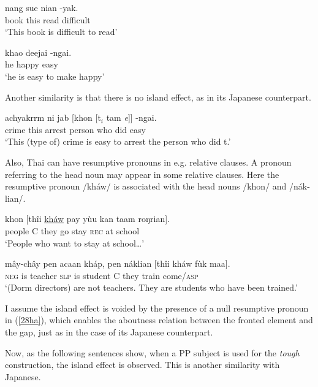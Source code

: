 \documentclass[output=paper,colorlinks,citecolor=brown,
]{langscibook}
\begin{document}
\begin{exe}
\ex \label{26ha}
\gll nang  sue  nian -yak.\\
book this read difficult\\
\glt ‘This book is difficult to read’

\ex \label{27ha}
\gll khao deejai -ngai.\\
he happy easy\\
\glt ‘he is easy to make happy’
\end{exe}

Another similarity is that there is no island effect, as in its Japanese counterpart.

\begin{exe}
\ex \label{28ha}
\gll achyakrrm ni  jab [khon  [t$_{i}$   tam  \textit{e}]]  -ngai.\\
crime this arrest person who did {} easy\\
\glt ‘This (type of) crime is easy to arrest the person who did t.’
\end{exe}

Also, Thai can have resumptive pronouns in e.g. relative clauses. A pronoun referring to the head noun may appear in some relative clauses. Here the resumptive pronoun /kháw/ is associated with the head nouns /khon/ and /nák-lian/.  

\begin{exe}
\ex \label{29ha}
\gll khon  [thîi \underline{kháw} pay yùu  kan taam roŋrian]. \\
people C they go stay \textsc{rec} at school\\
\glt ‘People who want to stay at school…’ \citep{IwasakiIngkaphirom2005}


\ex \label{30ha}
\gll mây-chây pen acaan kháp, pen náklian [thîi kháw fùk maa].\\
\textsc{neg} is teacher \textsc{slp} is student C they train come/\textsc{asp}\\
\glt ‘(Dorm directors) are not teachers. They are students who have been trained.’
\end{exe}

I assume the island effect is voided by the presence of a null resumptive pronoun in (\ref{28ha}), which enables the aboutness relation between the fronted element and the gap, just as in the case of its Japanese counterpart. 

Now, as the following sentences show, when a PP subject is used for the \textit{tough} construction, the island effect is observed. This is another similarity with Japanese.
\end{document}
